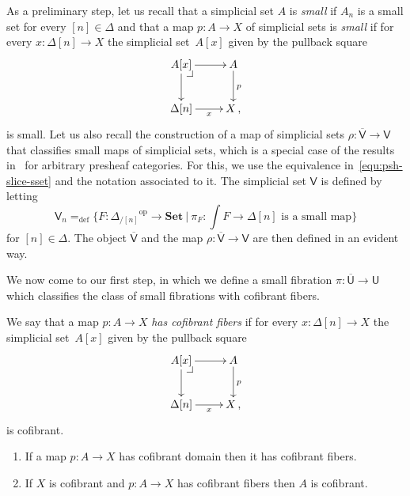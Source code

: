 \documentclass[reqno,10pt,a4paper,oneside,draft]{amsart}
\makeatletter
\numberwithin{equation}{section}
\theoremstyle{mythm}
\theoremstyle{mydef}
\theoremstyle{myrmk}
\newcommand{\pullback}[1]{\save*!/#1-1.2pc/#1:(-1,1)@^{|-}\restore}
\newcommand{\drpullback}{\pullback{dr}}
\newcommand{\defeq}{=_{\operatorname{def}}}
\newcommand{\co}{\colon}
\newcommand{\op}{\operatorname{op}}
\newcommand{\UU}{\overline{\mathsf{U}}}
\newcommand{\U}{\mathsf{U}}
\newcommand{\VV}{\overline{\mathsf{V}}}
\newcommand{\V}{\mathsf{V}}
\newcommand{\Set}{\mathbf{Set}}
\makeatother
\begin{document}
\medskip

As a preliminary step, let us recall that a simplicial set $A$ is \emph{small}  if $A_n$ is a small set for every $[n] \in \Delta$ and that a map $p \co A \to X$ of simplicial sets is \emph{small} if for every $x \co \Delta[n] 
\to X$ the simplicial set~$A[x]$ given by the pullback square
\[
\xymatrix{
A[x] \ar[r] \ar[d] \drpullback & A \ar[d]^{p} \\
\Delta[n] \ar[r]_-{x} & X \, , }
\]
is small. Let us also recall the  construction of a map of simplicial sets $\rho \co \VV \to \V$ that classifies
small maps of simplicial sets, which is a special case of the results in~\cite{hofmann-streicher-universes} for arbitrary presheaf categories.  For this, we use the equivalence in~\eqref{equ:psh-slice-sset} and the notation associated to it.
The simplicial set $\V$ is defined by letting
\[
\mathsf{V}_n \defeq \{ F \co {\Delta_{/[n]}}^{\op} \to \Set \ | \ \pi_F \co \textstyle{\int F} \to \Delta[n] \text{ is a small
map} \}
\]
for $[n] \in \Delta$. The object $\VV$ and the map $\rho \co \VV \to \V$ are then defined in an evident way. 


\bigskip

We now come to our first step, in which we define a small fibration $\pi \co \UU \to \U$ which 
classifies the class of small fibrations with cofibrant fibers. 

\begin{definition} We say that a map $p \co A \to X$ \emph{has cofibrant fibers} if for every $x \co \Delta[n] 
\to X$ the simplicial set~$A[x]$ given by the pullback square
\[
\xymatrix{
A[x] \ar[r] \ar[d] \drpullback & A \ar[d]^{p} \\
\Delta[n] \ar[r]_-{x} & X \, , }
\]
is cofibrant.
\end{definition}


\begin{lemma} \label{lem:Cofib_fiber} \hfill 
\begin{enumerate}[$(i)$]
\item If a map $p \co A \rightarrow X$ has cofibrant domain then it has cofibrant fibers.
\item If $X$ is cofibrant and $p \co A \rightarrow X$ has cofibrant fibers then $A$ is cofibrant.
\end{enumerate}
\end{lemma} 
\end{document}
